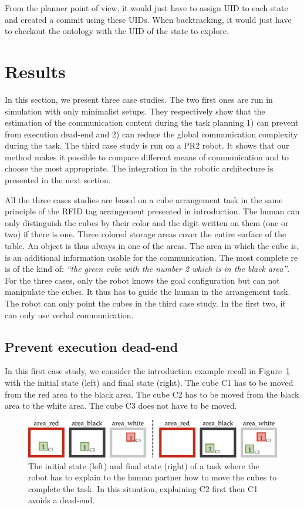 From the planner point of view, it would just have to assign UID to each state and created a commit using these UIDs. When backtracking, it would just have to checkout the ontology with the UID of the state to explore.

\section{Results}

In this section, we present three case studies. The two first ones are run in simulation with only minimalist setups. They respectively show that the estimation of the communication content during the task planning 1) can prevent from execution dead-end and 2) can reduce the global communication complexity during the task. The third case study is run on a PR2 robot. It shows that our method makes it possible to compare different means of communication and to choose the most appropriate. The integration in the robotic architecture is presented in the next section.

All the three cases studies are based on a cube arrangement task in the same principle of the RFID tag arrangement presented in introduction. The human can only distinguish the cubes by their color and the digit written on them (one or two) if there is one. Three colored storage areas cover the entire surface of the table. An object is thus always in one of the areas. The area in which the cube is, is an additional information usable for the communication. The most complete \acrshort{re} is of the kind of: \textit{``the green cube with the number 2 which is in the black area''}. For the three cases, only the robot knows the goal configuration but can not manipulate the cubes. It thus has to guide the human in the arrangement task. The robot can only point the cubes in the third case study. In the first two, it can only use verbal communication.

\subsection{Prevent execution dead-end}

In this first case study, we consider the introduction example recall in Figure~\ref{fig:chap5_case1} with the initial state (left) and final state (right). The cube C1 has to be moved from the red area to the black area. The cube C2 has to be moved from the black area to the white area. The cube C3 does not have to be moved.

\begin{figure}[!ht]
\centering
\includegraphics[width=\textwidth]{figures/chapter5/results_case1.png}
\caption{\label{fig:chap5_case1} The initial state (left) and final state (right) of a task where the robot has to explain to the human partner how to move the cubes to complete the task. In this situation, explaining C2 first then C1 avoids a dead-end. }
\end{figure}

